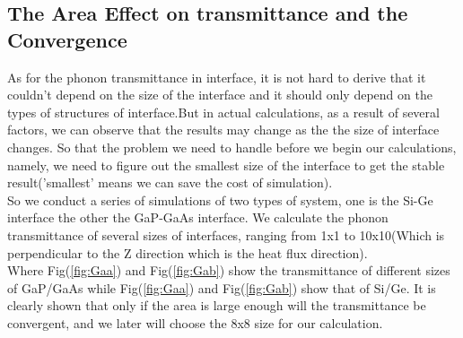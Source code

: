 \subsection{The Area Effect on transmittance and the Convergence}
As for the phonon transmittance in interface, it is not hard to derive that it couldn't depend on the size of the interface and it should only depend on the types of structures of interface.But in actual calculations, as a result of several factors, we can observe that the results may change as the the size of interface changes. So that the problem we need to handle before we begin our calculations, namely, we need to figure out the smallest size of the interface to get the stable result('smallest' means we can save the cost of simulation).\\
\indent So we conduct a series of simulations of two types of system, one is the Si-Ge interface the other the GaP-GaAs interface. We calculate the phonon transmittance of several sizes of interfaces, ranging from 1x1 to 10x10(Which is perpendicular to the Z direction which is the heat flux direction).\\
\indent Where Fig(\ref{fig:Gaa}) and Fig(\ref{fig:Gab}) show the transmittance of different sizes of GaP/GaAs while Fig(\ref{fig:Gaa}) and Fig(\ref{fig:Gab}) show that of Si/Ge. It is clearly shown that only if the area is large enough will the transmittance be convergent, and we later will choose the 8x8 size for our calculation.
